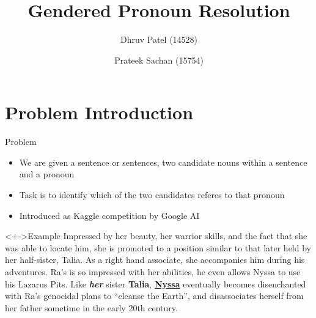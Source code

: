 \message{ !name(presentation.tex)}\documentclass[10pt]{beamer}
\title{Gendered Pronoun Resolution}
\author[Dhruv, Prateek]{ Dhruv Patel (14528) \and Prateek Sachan (15754)}
\institute[CSA, IISc.]{Computer Science and Automation, Indian Institute of Science}
\begin{document}

\begin{frame}
  \maketitle
\end{frame}

\section{Problem Introduction}
\begin{frame}{Problem}
  \begin{itemize}
  \item<+-> We are given a sentence or sentences, two candidate nouns within a sentence and a pronoun
  \item<+-> Task is to identify which of the two candidates referes to that pronoun
  \item<+-> Introduced as Kaggle competition by Google AI
  \end{itemize}

    \begin{block}<+->{Example}
      Impressed by her beauty, her warrior skills, and the fact that she was able to locate him, she is promoted to a position similar to that later held by her half-sister, Talia. As a right hand associate, she accompanies him during his adventures. Ra's is so impressed with her abilities, he even allows Nyssa to use his Lazarus Pits. Like \textit{\textbf{her}} sister \textbf{Talia}, \textbf{\underline{Nyssa}} eventually becomes disenchanted with Ra's genocidal plans to ``cleanse the Earth'', and disassociates herself from her father sometime in the early 20th century.
    \end{block}

\end{frame}
\end{document}
